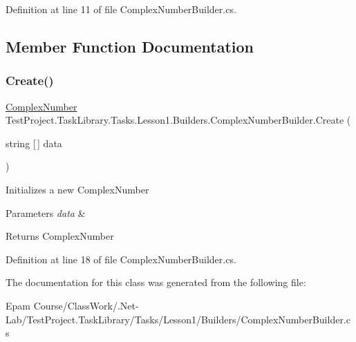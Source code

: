 Definition at line 11 of file Complex\+Number\+Builder.\+cs.



\subsection{Member Function Documentation}
\mbox{\label{class_test_project_1_1_task_library_1_1_tasks_1_1_lesson1_1_1_builders_1_1_complex_number_builder_a66ac5b11d083ddb0f0d52d08ed75e3d8}} 
\subsubsection{\texorpdfstring{Create()}{Create()}}
{\footnotesize\ttfamily \mbox{\hyperlink{class_test_project_1_1_task_library_1_1_tasks_1_1_lesson1_1_1_models_1_1_complex_number}{Complex\+Number}} Test\+Project.\+Task\+Library.\+Tasks.\+Lesson1.\+Builders.\+Complex\+Number\+Builder.\+Create (\begin{DoxyParamCaption}\item[{string \mbox{[}$\,$\mbox{]}}]{data }\end{DoxyParamCaption})}



Initializes a new Complex\+Number 


\begin{DoxyParams}{Parameters}
{\em data} & \\
\hline
\end{DoxyParams}
\begin{DoxyReturn}{Returns}
Complex\+Number
\end{DoxyReturn}


Definition at line 18 of file Complex\+Number\+Builder.\+cs.



The documentation for this class was generated from the following file\+:\begin{DoxyCompactItemize}
\item 
Epam Course/\+Class\+Work/.\+Net-\/\+Lab/\+Test\+Project.\+Task\+Library/\+Tasks/\+Lesson1/\+Builders/Complex\+Number\+Builder.\+cs\end{DoxyCompactItemize}
